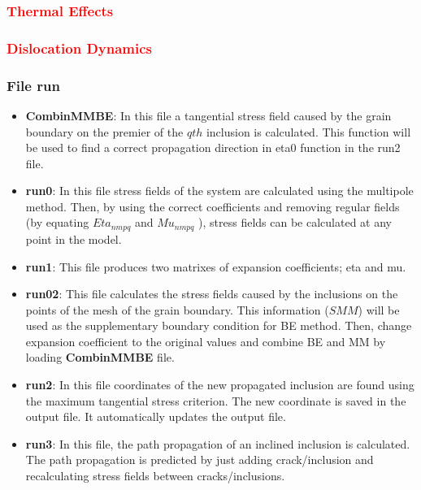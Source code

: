 \documentclass[12pt]{article}
\numberwithin{equation}{subsection}
\begin{document}
\clearpage
\subsubsection{\textcolor{red}{Thermal Effects}}

\clearpage
\subsubsection{\textcolor{red}{Dislocation Dynamics}}

\clearpage
\subsubsection{File run}

\begin{itemize}


\item  \textbf{CombinMMBE}:
In this file a tangential stress field caused by the grain boundary on the premier of 
the $qth$ inclusion is calculated. This function will be used to find a correct propagation direction in eta0 function in the run2 file.

\item  \textbf{run0}:
In this file stress fields of the system are calculated using the multipole 
method. Then, by using the correct coefficients and removing regular fields 
(by equating $Eta_{nmpq}$ and $Mu_{nmpq}$ ), stress fields can be calculated at any point 
in the model.

\item  \textbf{run1}: 
This file produces two matrixes of expansion coefficients; eta and mu.


\item  \textbf{run02}:
This file calculates the stress fields caused by the inclusions on the points of the mesh of the grain boundary. This information ($SMM$) will be used as the supplementary boundary condition for BE method.
Then, change expansion coefficient to the original values and combine BE and MM by loading \textbf{CombinMMBE} file. 

\item  \textbf{run2}: 
In this file coordinates of the new propagated inclusion are found using the maximum tangential stress criterion. The new coordinate is saved in the output file. It automatically updates the output file.

\item  \textbf{run3}: 
In this file, the path propagation of an inclined inclusion is calculated. The path propagation is predicted by just adding crack/inclusion and recalculating stress fields between cracks/inclusions. 
 

\end{itemize}
\end{document}
